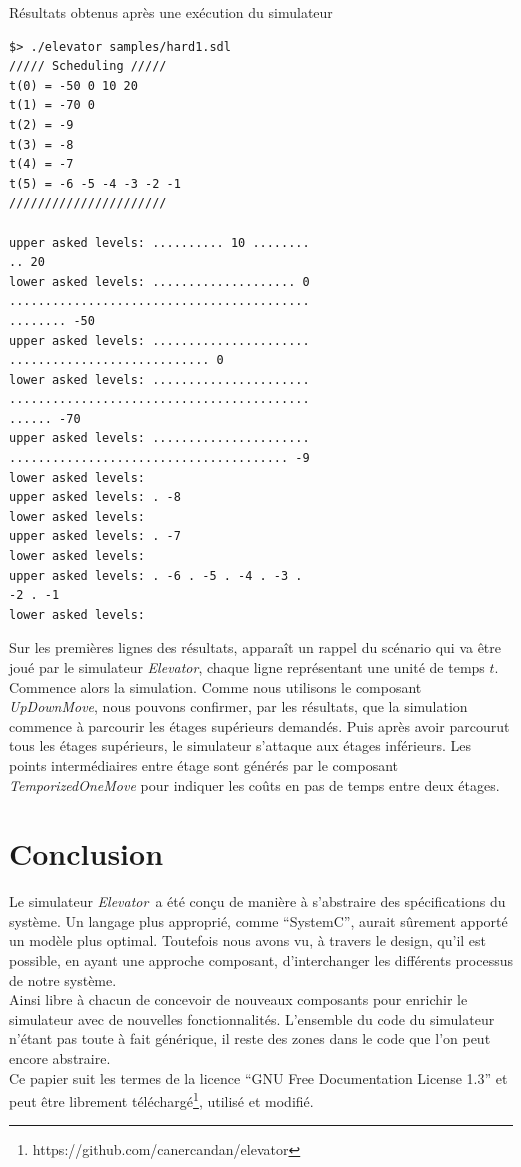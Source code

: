 \documentclass[twocolumn,oneside,10pt]{article}
\newcommand {\elevator}   {{\em Elevator}}
\begin{document}
\begin{algorithm}[h]
  \caption{Résultats obtenus après une exécution du simulateur}
  \label{exemple_execution}
\begin{verbatim}
$> ./elevator samples/hard1.sdl
///// Scheduling /////
t(0) = -50 0 10 20
t(1) = -70 0
t(2) = -9
t(3) = -8
t(4) = -7
t(5) = -6 -5 -4 -3 -2 -1
//////////////////////

upper asked levels: .......... 10 ........
.. 20
lower asked levels: .................... 0
..........................................
........ -50
upper asked levels: ......................
............................ 0
lower asked levels: ......................
..........................................
...... -70
upper asked levels: ......................
....................................... -9
lower asked levels:
upper asked levels: . -8
lower asked levels:
upper asked levels: . -7
lower asked levels:
upper asked levels: . -6 . -5 . -4 . -3 .
-2 . -1
lower asked levels:
\end{verbatim}
\end{algorithm}

Sur les premières lignes des résultats, apparaît un rappel du scénario qui va être joué par le simulateur \elevator, chaque ligne représentant une unité de temps $t$. Commence alors la simulation. Comme nous utilisons le composant {\em UpDownMove}, nous pouvons confirmer, par les résultats, que la simulation commence à parcourir les étages supérieurs demandés. Puis après avoir parcourut tous les étages supérieurs, le simulateur s'attaque aux étages inférieurs. Les points intermédiaires entre étage sont générés par le composant {\em TemporizedOneMove} pour indiquer les coûts en pas de temps entre deux étages.

\section{Conclusion}

Le simulateur \elevator\ a été conçu de manière à s'abstraire des spécifications du système. Un langage plus approprié, comme ``SystemC'', aurait sûrement apporté un modèle plus optimal. Toutefois nous avons vu, à travers le design, qu'il est possible, en ayant une approche composant, d'interchanger les différents processus de notre système.\\

Ainsi libre à chacun de concevoir de nouveaux composants pour enrichir le simulateur avec de nouvelles fonctionnalités. L'ensemble du code du simulateur n'étant pas toute à fait générique, il reste des zones dans le code que l'on peut encore abstraire.\\

Ce papier suit les termes de la licence ``GNU Free Documentation License 1.3'' et peut être librement téléchargé\footnote{https://github.com/canercandan/elevator}, utilisé et modifié.
\end{document}
